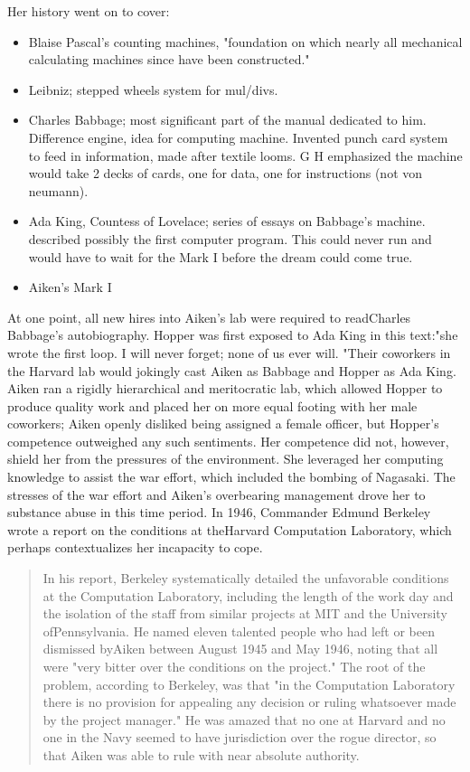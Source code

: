 Her history went on to cover:
\begin{itemize}
	\item Blaise Pascal's counting machines, "foundation on which
	      nearly all mechanical
	      calculating machines since have been constructed."
	\item Leibniz; stepped wheels system for mul/divs.
	\item Charles Babbage; most significant part of the manual dedicated to him.
	      Difference engine, idea for computing machine. Invented punch card system to
	      feed in information, made after textile looms. G H emphasized the
	      machine would
	      take 2 decks of cards, one for data, one for instructions (not
	      von neumann).
	\item Ada King, Countess of Lovelace; series of essays on Babbage's machine.
	      described possibly the first computer program. This could never
	      run and would
	      have to wait for the Mark I before the dream could come true.
	\item Aiken's Mark I
\end{itemize}

At one point, all new hires into Aiken's lab were
required to readCharles Babbage's autobiography. Hopper was first
exposed to Ada King in this text:"she wrote the first loop. I will
never forget; none of us ever will. "Their coworkers in the Harvard
lab would jokingly cast Aiken as Babbage and Hopper as Ada King. Aiken
ran a rigidly hierarchical and meritocratic lab, which allowed
Hopper to produce quality work and placed her on more equal footing
with her male coworkers; Aiken openly disliked being assigned a female
officer, but Hopper's competence outweighed any such sentiments. Her
competence did not, however, shield her from the pressures of the
environment. She leveraged her computing knowledge to assist the war
effort, which included the bombing of Nagasaki. The stresses of the war
effort and Aiken's overbearing management drove her to substance abuse
in this time period. In 1946, Commander Edmund Berkeley wrote a report
on the conditions at theHarvard Computation Laboratory, which perhaps
contextualizes her incapacity to cope.

\begin{quotation}
	In his report, Berkeley systematically detailed the unfavorable
	conditions at the Computation Laboratory, including the length of
	the work day and the isolation of the staff from similar projects at
	MIT and the University ofPennsylvania. He named eleven talented
	people who had left or been dismissed byAiken between August 1945
	and May 1946, noting that all were "very bitter over the conditions
	on the project." The root of the problem, according to Berkeley, was
	that "in the Computation Laboratory there is no provision for
	appealing any decision or ruling whatsoever made by the project
	manager." He was amazed that no one at Harvard and no one in the
	Navy seemed to have jurisdiction over the rogue director, so that
	Aiken was able to rule with near absolute authority.
\end{quotation}

